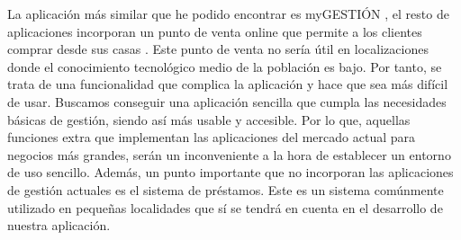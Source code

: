 La aplicación más similar que he podido encontrar es myGESTIÓN \cite{myGestion}, el resto de aplicaciones incorporan un punto de venta online que permite a los clientes comprar desde sus casas \cite{clover}. Este punto de venta no sería útil en localizaciones donde el conocimiento tecnológico medio de la población es bajo. Por tanto, se trata de una funcionalidad que complica la aplicación y hace que sea más difícil de usar. Buscamos conseguir una aplicación sencilla que cumpla las necesidades básicas de gestión, siendo así más usable y accesible. Por lo que, aquellas funciones extra que implementan las aplicaciones del mercado actual para negocios más grandes, serán un inconveniente a la hora de establecer un entorno de uso sencillo. Además, un punto importante que no incorporan las aplicaciones de gestión actuales es el sistema de préstamos. Este es un sistema comúnmente utilizado en pequeñas localidades que sí se tendrá en cuenta en el desarrollo de nuestra aplicación. 


